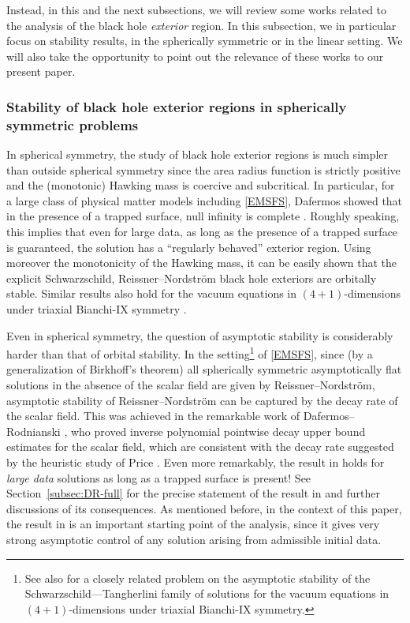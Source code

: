 \documentclass[10pt, reqno]{amsart}
\theoremstyle{definition}
\theoremstyle{remark}
\theoremstyle{conjecture}
\numberwithin{equation}{section}
\newcommand{\0}{\emptyset}
\begin{document}
Instead, in this and the next subsections, we will review some works related to the analysis of the black hole \emph{exterior} region. In this subsection, we in particular focus on stability results, in the spherically symmetric or in the linear setting. We will also take the opportunity to point out the relevance of these works to our present paper.

\subsubsection{Stability of black hole exterior regions in spherically symmetric problems}

In spherical symmetry, the study of black hole exterior regions is much simpler than outside spherical symmetry since the area radius function is strictly positive and the (monotonic) Hawking mass is coercive and subcritical. In particular, for a large class of physical matter models including \eqref{EMSFS}, Dafermos showed that in the presence of a trapped surface, null infinity is complete \cite{DafTrapped}. Roughly speaking, this implies that even for large data, as long as the presence of a trapped surface is guaranteed, the solution has a ``regularly behaved'' exterior region. Using moreover the monotonicity of the Hawking mass, it can be easily shown that the explicit Schwarzschild, Reissner--Nordstr\"om black hole exteriors are orbitally stable. Similar results also hold for the vacuum equations in $(4+1)$-dimensions under triaxial Bianchi-IX symmetry \cite{DafHol}.

Even in spherical symmetry, the question of asymptotic stability is considerably harder than that of orbital stability. In the setting\footnote{See also \cite{Hol.biaxial} for a closely related problem on the asymptotic stability of the Schwarzschild---Tangherlini family of solutions for the vacuum equations in $(4+1)$-dimensions under triaxial Bianchi-IX symmetry.} of \eqref{EMSFS}, since (by a generalization of Birkhoff's theorem) all spherically symmetric asymptotically flat solutions in the absence of the scalar field are given by Reissner--Nordstr\"om, asymptotic stability of Reissner--Nordstr\"om can be captured by the decay rate of the scalar field. This was achieved in the remarkable work of Dafermos--Rodnianski \cite{DRPL}, who proved inverse polynomial pointwise decay upper bound estimates for the scalar field, which are consistent with the decay rate suggested by the heuristic study of Price \cite{Price}. Even more remarkably, the result in \cite{DRPL} holds for \emph{large data} solutions as long as a trapped surface is present! See Section~\ref{subsec:DR-full} for the precise statement of the result in \cite{DRPL} and further discussions of its consequences. As mentioned before, in the context of this paper, the result in \cite{DRPL} is an important starting point of the analysis, since it gives very strong asymptotic control of any solution arising from admissible initial data. 
\end{document}
